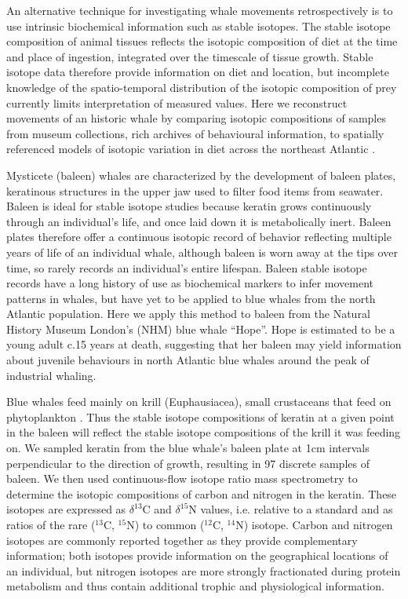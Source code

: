 \documentclass[a4paper,12pt]{article}
\begin{document}
An alternative technique for investigating whale movements retrospectively is to use intrinsic biochemical information such as stable isotopes\cite{west2006stable,busquets2017estimating,hobson2008tracking}. 
The stable isotope composition of animal tissues reflects the isotopic composition of diet at the time and place of ingestion, integrated over the timescale of tissue growth. 
Stable isotope data therefore provide information on diet and location, but incomplete knowledge of the spatio-temporal distribution of the isotopic composition of prey currently limits interpretation of measured values. 
Here we reconstruct movements of an historic whale by comparing isotopic compositions of samples from museum collections, rich archives of behavioural information\cite{lister2011natural}, to spatially referenced models of isotopic variation in diet across the northeast Atlantic \cite{hobson1999tracing,hobson2008tracking,eisenmann2016isotopic}. 

Mysticete (baleen) whales are characterized by the development of baleen plates, keratinous structures in the upper jaw used to filter food items from seawater. 
Baleen is ideal for stable isotope studies because keratin grows continuously through an individual's life, and once laid down it is metabolically inert\cite{best1996stable}. 
Baleen plates therefore offer a continuous isotopic record of behavior reflecting multiple years of life of an individual whale, although baleen is worn away at the tips over time, so rarely records an individual's entire lifespan. 
Baleen stable isotope records have a long history of use as biochemical markers to infer movement patterns in whales\cite{ryan2013stable,best1996stable,hobson1998stable,hobson2008tracking}, but have yet to be applied to blue whales from the north Atlantic population. 
Here we apply this method to baleen from the Natural History Museum London's (NHM) blue whale ``Hope''. 
Hope is estimated to be a young adult c.15 years at death, suggesting that her baleen may yield information about juvenile behaviours in north Atlantic blue whales around the peak of industrial whaling.
 
Blue whales feed mainly on krill (Euphausiacea), small crustaceans that feed on phytoplankton \cite{handbook}.
Thus the stable isotope compositions of keratin at a given point in the baleen will reflect the stable isotope compositions of the krill it was feeding on.
We sampled keratin from the blue whale's baleen plate at 1cm intervals perpendicular to the direction of growth, resulting in 97 discrete samples of baleen.
We then used continuous-flow isotope ratio mass spectrometry to determine the isotopic compositions of carbon and nitrogen in the keratin.
These isotopes are expressed as $\delta^{13}$C and $\delta^{15}$N values, i.e. relative to a standard and as ratios of the rare ($^{13}$C, $^{15}$N) to common ($^{12}$C, $^{14}$N) isotope\cite{west2006stable}.
Carbon and nitrogen isotopes are commonly reported together as they provide complementary information; both isotopes provide information on the geographical locations of an individual, but nitrogen isotopes are more strongly fractionated during protein metabolism and thus contain additional trophic and physiological information\cite{west2006stable}.
\end{document}
